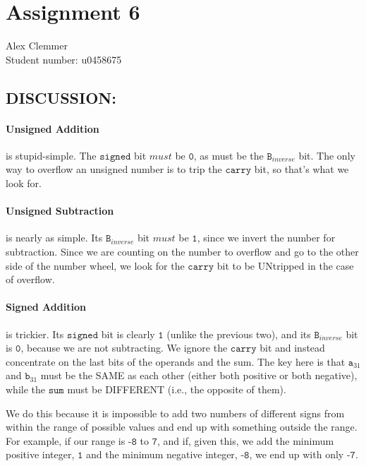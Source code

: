 \documentclass[a4paper]{article}
\begin{document}
\section*{Assignment 6 }
Alex Clemmer\\
Student number: u0458675

\subsection*{DISCUSSION:}
\paragraph*{Unsigned Addition} is stupid-simple. The $\texttt{signed}$ bit $\textit{must}$ be $\texttt{0}$, as must be the $\texttt{B}_{inverse}$ bit. The only way to overflow an unsigned number is to trip the $\texttt{carry}$ bit, so that's what we look for.

\paragraph*{Unsigned Subtraction} is nearly as simple. Its $\texttt{B}_{inverse}$ bit $\textit{must}$ be $\texttt{1}$, since we invert the number for subtraction. Since we are counting on the number to overflow and go to the other side of the number wheel, we look for the $\texttt{carry}$ bit to be UNtripped in the case of overflow.

\paragraph*{Signed Addition} is trickier. Its $\texttt{signed}$ bit is clearly $\texttt{1}$ (unlike the previous two), and its $\texttt{B}_{inverse}$ bit is $\texttt{0}$, because we are not subtracting. We ignore the $\texttt{carry}$ bit and instead concentrate on the last bits of the operands and the sum. The key here is that $\texttt{a}_{31}$ and $\texttt{b}_{31}$ must be the SAME as each other (either both positive or both negative), while the $\texttt{sum}$ must be DIFFERENT (i.e., the opposite of them).

We do this because it is impossible to add two numbers of different signs from within the range of possible values and end up with something outside the range. For example, if our range is $\texttt{-8}$ to $\texttt{7}$, and if, given this, we add the minimum positive integer, $\texttt{1}$ and the minimum negative integer, $\texttt{-8}$, we end up with only $\texttt{-7}$.
\end{document}
